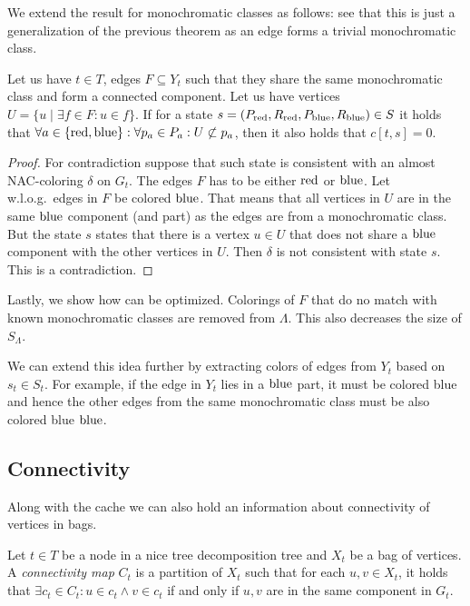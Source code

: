 We extend the result for monochromatic classes as follows:
see that this is just a generalization of the previous theorem
as an edge forms a trivial monochromatic class.
%
\begin{lemma}
	Let us have \( t \in T \),
	edges \( F \subseteq Y_t \) such that
	they share the same monochromatic class and form a connected component.
	Let us have vertices \( U = \{ u \mid \exists f \in F : u \in f \} \).
	If for a state \( s = (P_{\text{red}}, R_{\text{red}}, P_{\text{blue}}, R_{\text{blue}}) \in S \)
	it holds that
	\( {\forall a \in \{\text{red}, \text{blue}\} }:{ \forall p_a \in P_a }:{ U \not\subset p_a} \),
	then it also holds that \( c[t, s] = 0 \).
\end{lemma}
%
\begin{proof}
	For contradiction suppose that such state is consistent with
	an almost NAC-coloring \( \delta \) on \( G_t \).
	The edges \( F \) has to be either \( \text{red} \) or \( \text{blue} \).
	Let w.l.o.g.\ edges in \( F \) be colored \( \text{blue} \).
	That means that all vertices in \( U \) are in the same \( \text{blue} \) component (and part)
	as the edges are from a monochromatic class.
	But the state \( s \) states that there is a vertex \( u \in U \)
	that does not share a \( \text{blue} \) component with the other vertices in \( U \).
	Then \( \delta \) is not consistent with state \( s \).
	This is a contradiction.
\end{proof}
%

Lastly, we show how \IntroduceVertexWithEdgesNode{} can be optimized.
Colorings of \( F \) that do no match with known monochromatic classes
are removed from \( \Lambda \). This also decreases the size of \( S_\Lambda \).

We can extend this idea further by extracting colors of edges from \( Y_{t} \)
based on \( s_t \in S_t \).
For example, if the edge in \( Y_{t} \) lies in a \( \text{blue} \) part,
it must be colored blue and hence
the other edges from the same monochromatic class
must be also colored blue \( \text{blue} \).


\subsection{Connectivity}

Along with the cache we can also hold an information about connectivity of
vertices in bags.
%
\begin{definition}
	Let \( t \in T \) be a node in a nice tree decomposition tree and
	\( X_t \) be a bag of vertices.
	A \emph{connectivity map} \( C_t \) is a partition of \( X_t \) such that
	for each \( u, v \in X_t \), it holds that
	\( \exists c_t \in C_t : u \in c_t \land v \in c_t \) if and only if
	\( u, v \) are in the same component in \( G_t \).
\end{definition}
%

